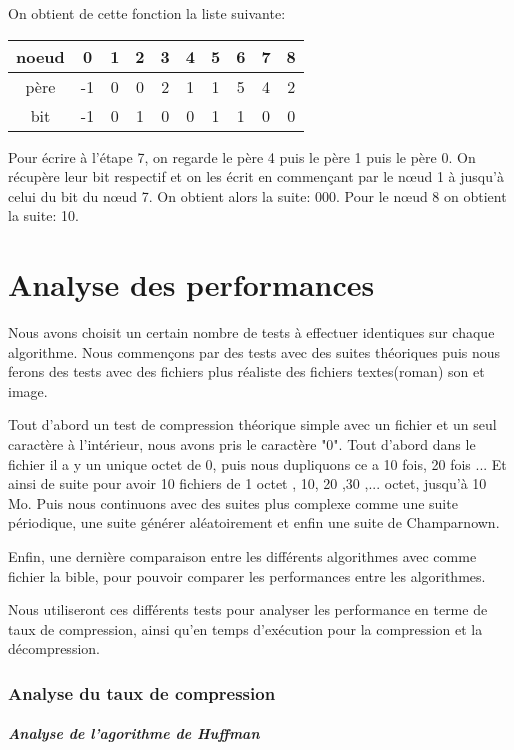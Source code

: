 \documentclass{report}
\begin{document}
On obtient de cette fonction la liste suivante:
\begin{center}
\begin{tabular}{|c|c|c|c|c|c|c|c|c|c|}
\hline
noeud & 0 & 1 & 2 & 3 & 4 & 5 & 6 & 7 & 8 \\
\hline
père & -1 & 0 & 0 & 2 & 1 & 1 & 5 & 4 & 2\\
\hline
bit & -1 & 0 & 1 & 0 & 0 & 1 & 1 & 0 & 0 \\
\hline 
\end{tabular}
\end{center}
 
Pour écrire à l'étape 7, on regarde le père 4 puis le père 1 puis le père 0. 
On récupère leur bit respectif et on les écrit en commençant par le nœud  1 à jusqu'à celui du bit du nœud 7. On obtient alors la suite: 000.
Pour le nœud 8 on obtient la suite: 10. 


\part{Analyse des performances}
Nous avons choisit un certain nombre de tests à effectuer identiques sur chaque algorithme. Nous commençons par des tests avec des suites théoriques puis nous ferons des tests avec des fichiers plus réaliste des fichiers textes(roman) son et image.
 
Tout d'abord un test de compression théorique simple avec un fichier et un seul caractère à l'intérieur, nous avons pris le caractère "0".
Tout d'abord dans le fichier il a y un unique octet de 0, puis nous dupliquons ce a 10 fois, 20 fois ... Et ainsi de suite pour avoir 10 fichiers de 1 octet , 10, 20 ,30 ,...  octet, jusqu'à 10 Mo.
Puis nous continuons avec des suites plus complexe comme une suite périodique, une suite générer aléatoirement et enfin une suite de Champarnown.  

Enfin, une dernière comparaison entre les différents algorithmes avec comme fichier la bible, pour pouvoir comparer les performances entre les algorithmes.

Nous utiliseront ces différents tests pour analyser les performance en terme de taux de compression, ainsi qu'en temps d’exécution pour la compression et la décompression. 
\section*{Analyse du taux de compression}
\subsubsection{ Analyse de l'agorithme de Huffman}
\end{document}
